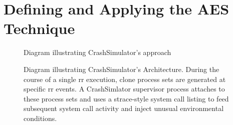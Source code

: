 \section{Defining and Applying the AES Technique}
\label{SEC:approach}

\begin{figure}[t]
  \center{}
  \caption{Diagram illustrating CrashSimulator's approach}
  \label{figure:approach}
\end{figure}

\begin{figure}[t]
  \center{}
  \caption{Diagram illustrating CrashSimulator's Architecture.  During the
    course of a single rr execution, clone process sets are generated at
    specific rr events.  A CrashSimlator supervisor process attaches to
    these process sets and uses a strace-style system call listing to feed
    subsequent system call activity and inject unusual environmental
    conditions.}
  \label{figure:architecture}
\end{figure}

